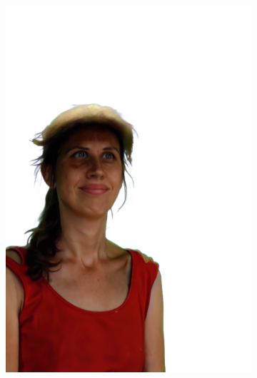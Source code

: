 \begin{figure}[ht]
\begin{subfigure}{0.08\linewidth}
        \includegraphics[width=\textwidth]{Figures/results/low/dora_cowboy/11_render.png}

\end{subfigure}
\end{figure}

